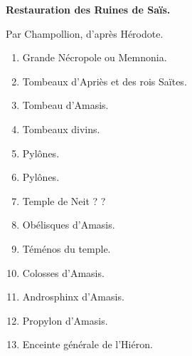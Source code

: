 \documentclass[letterpaper,twocolumn,openany,nodeprecatedcode]{dndbook}
\begin{document}
\begin{center}
\textbf{Restauration des Ruines de Saïs.}

Par Champollion, d'après Hérodote.
\begin{enumerate}
    \centering
    \footnotesize
    \item Grande Nécropole ou Memnonia.
    \item Tombeaux d'Apriès et des rois Saïtes.
    \item Tombeau d'Amasis.
    \item Tombeaux divins.
    \item Pylônes.
    \item Pylônes.
    \item Temple de Neit ? ?
    \item Obélisques d'Amasis.
    \item Téménos du temple.
    \item Colosses d'Amasis.
    \item Androsphinx d'Amasis.
    \item Propylon d'Amasis.
    \item Enceinte générale de l'Hiéron.
\end{enumerate}
\end{center}
\clearpage
\twocolumn
\end{document}

